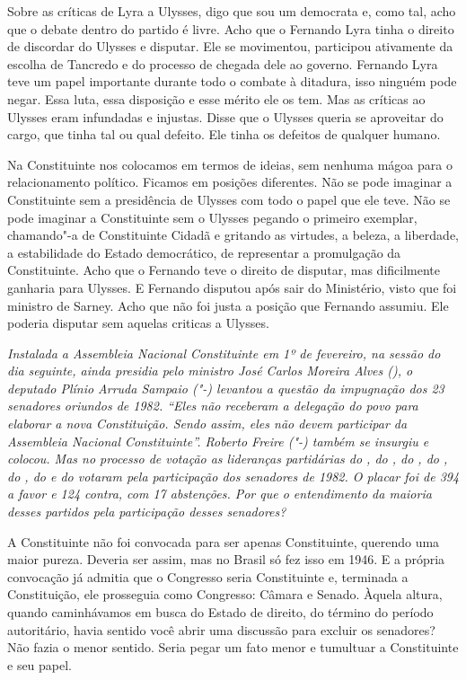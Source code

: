 Sobre as críticas de Lyra a Ulysses, digo que sou um democrata e, como
tal, acho que o debate dentro do partido é livre. Acho que o Fernando
Lyra tinha o direito de discordar do Ulysses e disputar. Ele se
movimentou, participou ativamente da escolha de Tancredo e do processo
de chegada dele ao governo. Fernando Lyra teve um papel importante
durante todo o combate à ditadura, isso ninguém pode negar. Essa luta,
essa disposição e esse mérito ele os tem. Mas as críticas ao Ulysses
eram infundadas e injustas. Disse que o Ulysses queria se aproveitar do
cargo, que tinha tal ou qual defeito. Ele tinha os defeitos de qualquer
humano.

Na Constituinte nos colocamos em termos de ideias, sem nenhuma mágoa
para o relacionamento político. Ficamos em posições diferentes. Não se
pode imaginar a Constituinte sem a presidência de Ulysses com todo o
papel que ele teve. Não se pode imaginar a Constituinte sem o Ulysses
pegando o primeiro exemplar, chamando"-a de Constituinte Cidadã e
gritando as virtudes, a beleza, a liberdade, a estabilidade do Estado
democrático, de representar a promulgação da Constituinte. Acho que o
Fernando teve o direito de disputar, mas dificilmente ganharia para
Ulysses. E Fernando disputou após sair do Ministério, visto que foi
ministro de Sarney. Acho que não foi justa a posição que Fernando
assumiu. Ele poderia disputar sem aquelas criticas a Ulysses.

\medskip

\noindent\emph{Instalada a Assembleia Nacional Constituinte em 1º de fevereiro,
na sessão do dia seguinte, ainda presidia pelo ministro José Carlos
Moreira Alves (), o deputado Plínio Arruda Sampaio ("-) levantou a
questão da impugnação dos 23 senadores oriundos de 1982. ``Eles não
receberam a delegação do povo para elaborar a nova Constituição. Sendo
assim, eles não devem participar da Assembleia Nacional Constituinte''.
Roberto Freire ("-) também se insurgiu e colocou. Mas no processo de
votação as lideranças partidárias do , do , do , do , do
, do  e do  votaram pela participação dos senadores de 1982. O
placar foi de 394 a favor e 124 contra, com 17 abstenções. Por que o
entendimento da maioria desses partidos pela participação desses
senadores?}

A Constituinte não foi convocada para ser apenas
Constituinte, querendo uma maior pureza. Deveria ser assim, mas no
Brasil só fez isso em 1946. E a própria convocação já admitia que o
Congresso seria Constituinte e, terminada a Constituição, ele prosseguia
como Congresso: Câmara e Senado. Àquela altura, quando caminhávamos em
busca do Estado de direito, do término do período autoritário, havia
sentido você abrir uma discussão para excluir os senadores? Não fazia o
menor sentido. Seria pegar um fato menor e tumultuar a Constituinte e
seu papel.

